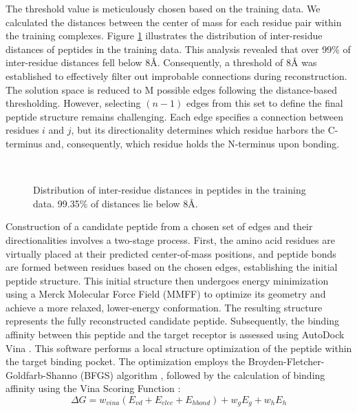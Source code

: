 The threshold value is meticulously chosen based on the training data. We calculated the distances between the center of mass for each residue pair within the training complexes. Figure \ref{fig:irds} illustrates the distribution of inter-residue distances of peptides in the training data. This analysis revealed that over 99\% of inter-residue distances fell below 8Å. Consequently, a threshold of 8Å was established to effectively filter out improbable connections during reconstruction. \\
The solution space is reduced to M possible edges following the distance-based thresholding. However, selecting $(n-1)$ edges from this set to define the final peptide structure remains challenging. Each edge specifies a connection between residues $i$ and $j$, but its directionality determines which residue harbors the C-terminus and, consequently, which residue holds the N-terminus upon bonding.  \\

\begin{figure}
  \center

   \\

  \caption{Distribution of inter-residue distances in peptides in the training data. 99.35\% of distances lie below 8Å.}

  \label{fig:irds}
\end{figure}

Construction of a candidate peptide from a chosen set of edges and their directionalities involves a two-stage process. First, the amino acid residues are virtually placed at their predicted center-of-mass positions, and peptide bonds are formed between residues based on the chosen edges, establishing the initial peptide structure. This initial structure then undergoes energy minimization using a Merck Molecular Force Field (MMFF) \cite{halgren1996merck} to optimize its geometry and achieve a more relaxed, lower-energy conformation. The resulting structure represents the fully reconstructed candidate peptide. Subsequently, the binding affinity between this peptide and the target receptor is assessed using AutoDock Vina \cite{trott2010autodock}. This software performs a local structure optimization of the peptide within the target binding pocket. The optimization employs the Broyden-Fletcher-Goldfarb-Shanno (BFGS) algorithm \cite{head1985broyden}, followed by the calculation of binding affinity using the Vina Scoring Function \cite{trott2010autodock}:
$$\Delta G = w_{vina}(E_{vd}+ E_{elec} + E_{hbond}) + w_gE_g + w_hE_h$$

